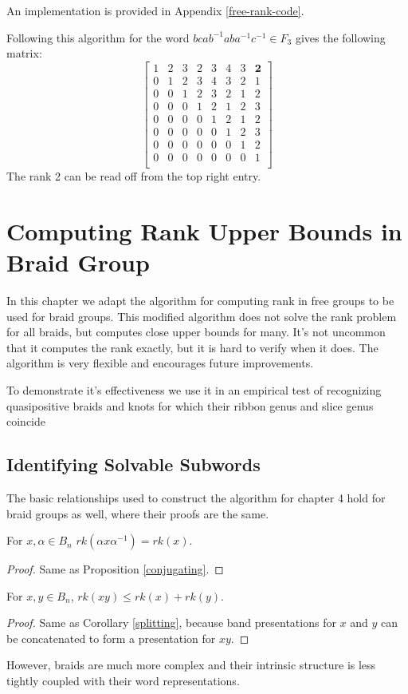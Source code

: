 \documentclass[12pt]{thesis}
\begin{document}
An implementation is provided in Appendix \ref{free-rank-code}.

\begin{example}
    Following this algorithm for the word $bcab^{-1}aba^{-1}c^{-1} \in F_{3}$ gives the following matrix:
\[
\begin{bmatrix}
    1 & 2 & 3 & 2 & 3 & 4 & 3 & \boldsymbol{2} \\ 
    0 & 1 & 2 & 3 & 4 & 3 & 2 & 1 \\
    0 & 0 & 1 & 2 & 3 & 2 & 1 & 2 \\
    0 & 0 & 0 & 1 & 2 & 1 & 2 & 3 \\
    0 & 0 & 0 & 0 & 1 & 2 & 1 & 2 \\
    0 & 0 & 0 & 0 & 0 & 1 & 2 & 3 \\
    0 & 0 & 0 & 0 & 0 & 0 & 1 & 2 \\
    0 & 0 & 0 & 0 & 0 & 0 & 0 & 1 \\
\end{bmatrix}
\]
The rank 2 can be read off from the top right entry.
\end{example}

\chapter{Computing Rank Upper Bounds in Braid Group}

\label{chap:braid-rank}

In this chapter we adapt the algorithm for computing
rank in free groups to be used for braid groups.
This modified algorithm does not solve the rank problem for all braids,
but computes close upper bounds for many.
It's not uncommon that it computes the rank exactly,
but it is hard to verify when it does.
The algorithm is very flexible and encourages future improvements.

To demonstrate it's effectiveness we use it in an empirical
test of recognizing quasipositive braids and knots for which their ribbon genus
and slice genus coincide

\section{Identifying Solvable Subwords}

The basic relationships used to construct the algorithm for chapter 4 hold for braid
groups as well, where their proofs are the same.
\begin{proposition}
    For $x, \alpha \in B_{n}$
         $rk(\alpha x \alpha^{-1}) = rk(x)$.
\end{proposition}
\begin{proof}
 Same as Proposition \ref{conjugating}.
\end{proof}
\begin{proposition}
    For $x, y \in B_{n}$,
    $rk(xy) \leq rk(x) + rk(y)$.
\end{proposition}
\begin{proof}
  Same as Corollary \ref{splitting},
 because band presentations for $x$ and $y$
can be concatenated to form a presentation for $xy$.
\end{proof}
However, braids are much more complex and their intrinsic structure
is less tightly coupled with their word representations.
\end{document}
